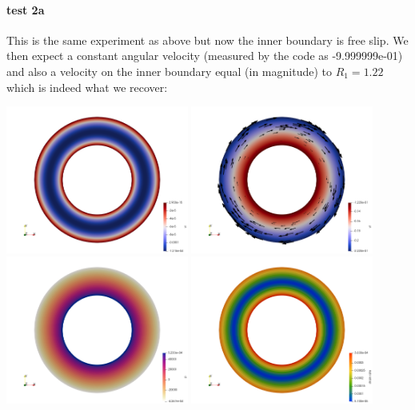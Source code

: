 \paragraph{test 2a}
This is the same experiment as above but now the inner boundary is free slip. We then 
expect a constant angular velocity (measured by the code as  -9.999999e-01)  
and also a velocity on the inner boundary equal (in magnitude) to $R_1=1.22$ which is 
indeed what we recover:  

\begin{center}
\includegraphics[width=6cm]{python_codes/fieldstone_33/results_test2/vr}
\includegraphics[width=6cm]{python_codes/fieldstone_33/results_test2/vt}\\
\includegraphics[width=6cm]{python_codes/fieldstone_33/results_test2/p}
\includegraphics[width=6cm]{python_codes/fieldstone_33/results_test2/sr}
\end{center}

